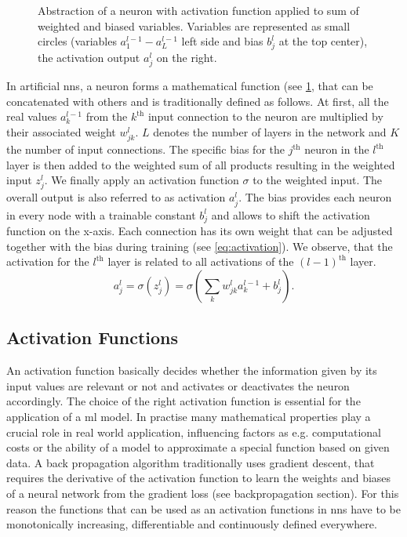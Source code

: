 \begin{figure}[hbt]
    
    \caption[Neuron]{Abstraction of a neuron with activation function applied to sum of weighted and biased variables. Variables are represented as small circles (variables \( a^{l-1}_1 - a^{l-1}_L \) left side and bias \( b^l_j \) at the top center), the activation output \( a^l_j \) on the right. \cite{Reading.2019}}
    \label{fig:neuron}
\end{figure}
In artificial \acrshort{nn}s, a neuron forms a mathematical function (see \cref{fig:neuron}, that can be concatenated with others and is traditionally defined as follows. At first, all the real values \( a^{l-1}_k \) from the \( k^{\text{th}} \) input connection to the neuron are multiplied by their associated weight \( w^l_{jk} \). \( L \) denotes the number of layers in the network and \( K \) the number of input connections. The specific bias for the \( j^{\text{th}} \) neuron in the \( l^{\text{th}} \) layer is then added to the weighted sum of all products resulting in the weighted input \( z^l_j \). We finally apply an activation function \( \sigma \) to the weighted input. The overall output is also referred to as activation \( a^l_j \). The bias provides each neuron in every node with a trainable constant \( b^l_j \) and allows to shift the activation function on the x-axis. Each connection has its own weight that can be adjusted together with the bias during training (see \cref{eq:activation}). We observe, that the activation for the \( l^{\text{th}} \) layer is related to all activations of the \( (l-1)^{\text{th}} \) layer.
\begin{equation}
    a^l_j = \sigma(z^l_j) = \sigma\left(\sum_k w^l_{jk} a^{l-1}_k + b^l_j\right).
    \label{eq:activation}
\end{equation}

\subsection{Activation Functions}

An activation function basically decides whether the information given by its input values are relevant or not and activates or deactivates the neuron accordingly. The choice of the right activation function is essential for the application of a \acrshort{ml} model. In practise many mathematical properties play a crucial role in real world application, influencing factors as e.g. computational costs or the ability of a model to approximate a special function based on given data. A back propagation algorithm traditionally uses gradient descent, that requires the derivative of the activation function to learn the weights and biases of a neural network from the gradient loss (see backpropagation section). For this reason the functions that can be used as an activation functions in \acrshort{nn}s have to be monotonically increasing, differentiable and continuously defined everywhere.

